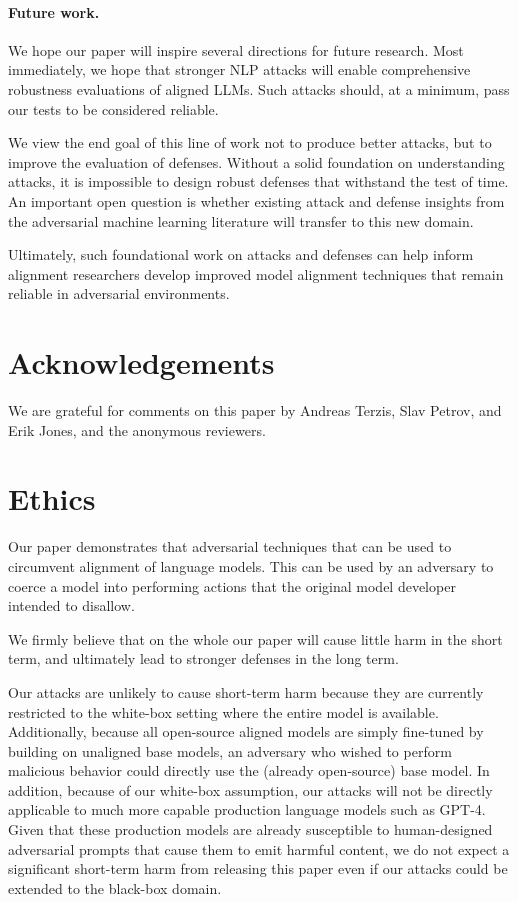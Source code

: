 \documentclass{article}
\begin{document}
\paragraph{Future work.}
We hope our paper will inspire several directions for future research.
%
Most immediately, we hope that stronger NLP attacks  
will enable comprehensive robustness evaluations of aligned LLMs.
%
Such attacks should, at a minimum, pass our tests to be considered reliable.

We view the end goal of this line of work not to produce better attacks,
but to improve the evaluation of defenses.
%
Without a solid foundation on understanding attacks,
it is impossible to design robust defenses that withstand the test of time.
%
An important open question is whether existing attack and defense insights from
the adversarial machine learning literature will transfer to this new domain.

Ultimately, such foundational work on attacks and defenses can
help inform alignment researchers develop improved model alignment 
techniques that remain reliable in adversarial environments.

\section*{Acknowledgements}
We are grateful for comments on this paper by Andreas Terzis, Slav Petrov, and Erik Jones, and the anonymous reviewers.





\appendix
\newpage
\section{Ethics}

Our paper demonstrates that adversarial techniques that can be used to circumvent 
alignment of language models.
%
This can be used by an adversary to coerce a model into performing actions
that the original model developer intended to disallow.

We firmly believe that on the whole our paper will cause little harm in the short term,
and ultimately lead to stronger defenses in the long term.


Our attacks are unlikely to cause short-term harm because they are currently restricted
to the white-box setting where the entire model is available.
%
Additionally, because all open-source aligned models are simply fine-tuned by building on
unaligned base models, an adversary who wished to perform malicious behavior could
directly use the (already open-source) base model.
%
In addition, because of our white-box assumption,
our attacks will not be directly applicable to much more capable
production language models such as GPT-4.
%
Given that these production models are 
already susceptible to 
human-designed adversarial prompts that
cause them to emit harmful content,
we do not expect a significant short-term harm from releasing this paper even if our attacks could be extended to the black-box domain.
\end{document}
